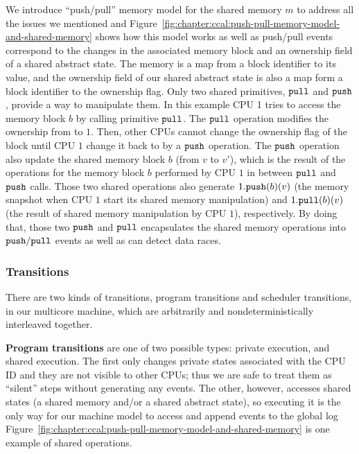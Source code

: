 We introduce ``push/pull'' memory model for the shared memory $m$ to address all the issues we mentioned and 
Figure~\ref{fig:chapter:ccal:push-pull-memory-model-and-shared-memory} shows 
how this model works as well as push/pull events correspond to the changes in the associated memory block and an ownership field of a shared abstract state.
The memory is a map from a block identifier to its value,
and the ownership field of our shared abstract state is also a map form a block identifier to the ownership flag.
Only two shared primitives, ${\mathrm{\texttt{pull}}}$ and ${\mathrm{\texttt{push}}}$,
provide a way to manipulate them.
In this example CPU 1 tries to access the memory block $b$ by calling primitive ${\mathrm{\texttt{pull}}}$. 
The ${\mathrm{\texttt{pull}}}$ operation modifies the ownership from  to  $1$. 
Then, other CPUs cannot change the ownership flag of the block until CPU $1$ change it back to  
by a ${\mathrm{\texttt{push}}}$ operation.
The ${\mathrm{\texttt{push}}}$ operation also update the shared memory block $b$ (from $v$ to $v'$), which is the result of the operations for the memory block $b$ performed by CPU $1$ in between ${\mathrm{\texttt{pull}}}$ and ${\mathrm{\texttt{push}}}$ calls. 
Those two shared operations also generate $1.{\mathrm{\texttt{push}}}(b)(v)$ (the memory snapshot when CPU $1$ start its shared memory manipulation) 
and  $1.{\mathrm{\texttt{pull}}}(b)(v)$ (the result of shared memory manipulation by CPU $1$), respectively.
By doing that, those two ${\mathrm{\texttt{push}}}$ and ${\mathrm{\texttt{pull}}}$ encapsulates the shared memory operations
into ${\mathrm{\texttt{push}}}/{\mathrm{\texttt{pull}}}$ events as well as can detect data races.

\subsubsection{Transitions}

There are two kinds of transitions, program transitions and scheduler transitions, in our multicore machine,
which are arbitrarily and nondeterministically interleaved together.


\textbf{Program transitions} are one of two possible types:
private execution, and shared execution.
The first only changes private states associated with the CPU ID and 
they are not visible to other CPUs;
thus we are safe to treat them as ``silent'' steps without generating any events. 
The other, however, 
accesses shared states (a shared memory and/or a shared abstract state),
so executing it is  the only way for our machine model  to access and append events to the global log 
Figure~\ref{fig:chapter:ccal:push-pull-memory-model-and-shared-memory} is one example of shared operations.


